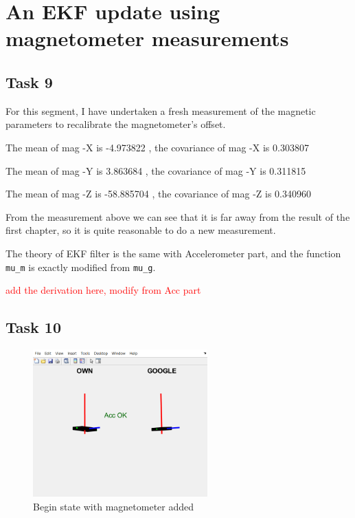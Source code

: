 \section{An EKF update using magnetometer measurements}

\subsection{Task 9}

For this segment, I have undertaken a fresh measurement of the magnetic parameters to recalibrate the magnetometer's offset.

The mean of mag -X is -4.973822 
, the covariance of mag -X is 0.303807  

The mean of mag -Y is 3.863684 
, the covariance of mag -Y is 0.311815 

The mean of mag -Z is -58.885704 
, the covariance of mag -Z is 0.340960 

From the measurement above we can see that it is far away from the result of the first chapter, so it is quite reasonable to do a new measurement.

The theory of EKF filter is the same with Accelerometer part, and the function  \texttt{mu\_m} is exactly modified from \texttt{mu\_g}.

\textcolor{red}{add the derivation here, modify from Acc part}


\subsection{Task 10}

\begin{figure}[H]
 \centering
 \includegraphics[width=0.6\textwidth]{images/magbegin.png}
 \caption{Begin state with magnetometer added}
 \label{magbegin}
\end{figure}

